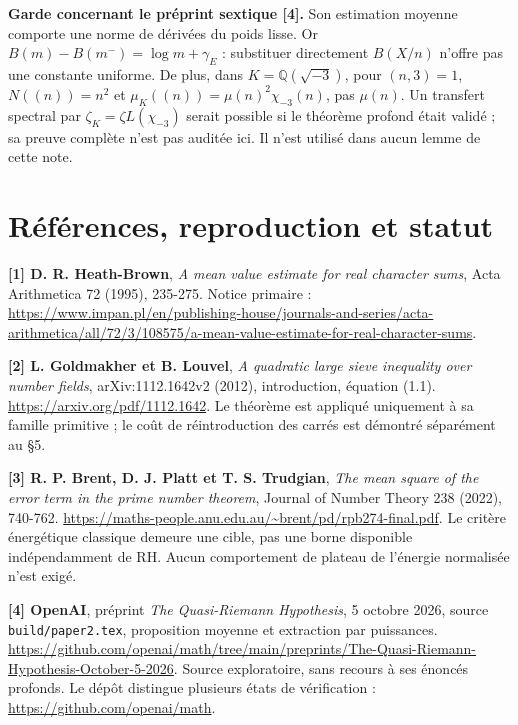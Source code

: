 \documentclass[
  11pt,
  a4paper,
]{article}
\begin{document}
\textbf{Garde concernant le préprint sextique {[}4{]}.} Son estimation
moyenne comporte une norme de dérivées du poids lisse. Or
\(B(m)-B(m^-)=\log m+\gamma_E\) : substituer directement \(B(X/n)\)
n'offre pas une constante uniforme. De plus, dans
\(K=\mathbb Q(\sqrt{-3})\), pour \((n,3)=1\), \(N((n))=n^2\) et
\(\mu_K((n))=\mu(n)^2\chi_{-3}(n)\), pas \(\mu(n)\). Un transfert
spectral par \(\zeta_K=\zeta L(\chi_{-3})\) serait possible si le
théorème profond était validé ; sa preuve complète n'est pas auditée
ici. Il n'est utilisé dans aucun lemme de cette note.

\newpage

\hypertarget{ruxe9fuxe9rences-reproduction-et-statut}{%
\section{Références, reproduction et
statut}\label{ruxe9fuxe9rences-reproduction-et-statut}}

\textbf{{[}1{]} D. R. Heath-Brown}, \emph{A mean value estimate for real
character sums}, Acta Arithmetica 72 (1995), 235-275. Notice primaire :
\url{https://www.impan.pl/en/publishing-house/journals-and-series/acta-arithmetica/all/72/3/108575/a-mean-value-estimate-for-real-character-sums}.

\textbf{{[}2{]} L. Goldmakher et B. Louvel}, \emph{A quadratic large
sieve inequality over number fields}, arXiv:1112.1642v2 (2012),
introduction, équation (1.1). \url{https://arxiv.org/pdf/1112.1642}. Le
théorème est appliqué uniquement à sa famille primitive ; le coût de
réintroduction des carrés est démontré séparément au §5.

\textbf{{[}3{]} R. P. Brent, D. J. Platt et T. S. Trudgian}, \emph{The
mean square of the error term in the prime number theorem}, Journal of
Number Theory 238 (2022), 740-762.
\url{https://maths-people.anu.edu.au/~brent/pd/rpb274-final.pdf}. Le
critère énergétique classique demeure une cible, pas une borne
disponible indépendamment de RH. Aucun comportement de plateau de
l'énergie normalisée n'est exigé.

\textbf{{[}4{]} OpenAI}, préprint \emph{The Quasi-Riemann Hypothesis}, 5
octobre 2026, source \texttt{build/paper2.tex}, proposition moyenne et
extraction par puissances.
\url{https://github.com/openai/math/tree/main/preprints/The-Quasi-Riemann-Hypothesis-October-5-2026}.
Source exploratoire, sans recours à ses énoncés profonds. Le dépôt
distingue plusieurs états de vérification :
\url{https://github.com/openai/math}.
\end{document}
